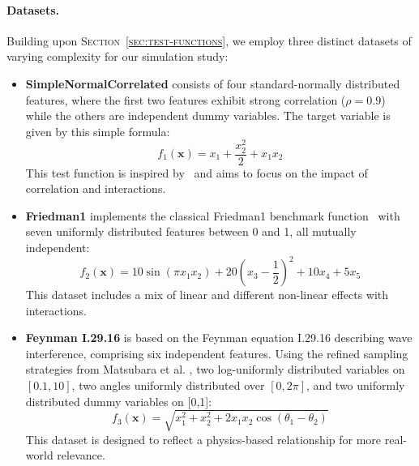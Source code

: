 \documentclass[runningheads]{llncs}
\begin{document}
\paragraph{Datasets.}
Building upon \textsc{Section~\ref{sec:test-functions}}, we employ three
distinct datasets of varying complexity for our simulation study:

\begin{itemize}[label=--]
    \item \textbf{SimpleNormalCorrelated} consists of four
          standard-normally distributed features, where the first two
          features exhibit strong correlation ($\rho = 0.9$) while the others are
          independent dummy variables. The target variable is given by this simple
          formula:
          \begin{equation}
              f_1(\boldsymbol{x}) = x_1 + \frac{x_2^2}{2} + x_1 x_2
          \end{equation}
          This test function is inspired by~\cite{liu_model_2018} and aims
          to focus on the impact of correlation and interactions.
    \item \textbf{Friedman1} implements the classical Friedman1 benchmark
          function~\cite{breiman_bagging_1996,friedman_multivariate_1991}
          with seven uniformly distributed features between 0 and 1, all mutually
          independent:
          \begin{equation}
              f_2(\boldsymbol{x}) = 10 \sin(\pi x_1 x_2) + 20(x_3 - \frac{1}{2})^2 + 10 x_4 + 5 x_5
          \end{equation}
          This dataset includes a mix of linear and different non-linear effects with
          interactions.
    \item \textbf{Feynman I.29.16} is based on the Feynman equation I.29.16
          describing wave interference, comprising six independent features. Using
          the refined sampling strategies from Matsubara et al. \cite{matsubara_rethinking_2024},
          two log-uniformly distributed variables on $[0.1, 10]$, two angles uniformly
          distributed over $[0, 2\pi]$, and two uniformly distributed dummy variables on [0,1]:
          \begin{equation}
              f_3(\boldsymbol{x}) = \sqrt{x_1^2 + x_2^2 + 2 x_1 x_2 \cos(\theta_1 - \theta_2)}
          \end{equation}
          This dataset is designed to reflect a physics-based relationship for more real-world relevance.

\end{itemize}
\end{document}
